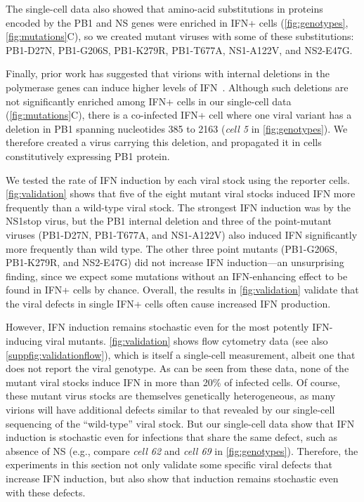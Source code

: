 \documentclass[lineno]{asm-article}
\newcommand{\FIG}[1]{\autoref{fig:#1}}
\newcommand{\SUPPFIG}[1]{\autoref{suppfig:#1}}
\begin{document}
The single-cell data also showed that amino-acid substitutions in proteins encoded by the PB1 and NS genes were enriched in IFN+ cells (\FIG{genotypes}, \FIG{mutations}C), so we created mutant viruses with some of these substitutions:
PB1-D27N, PB1-G206S, PB1-K279R, PB1-T677A, NS1-A122V, and NS2-E47G.

Finally, prior work has suggested that virions with internal deletions in the polymerase genes can induce higher levels of IFN~\cite{wang2018cell, baum2010preference, tapia2013defective, boergeling2015evidence, dimmock2015cloned, liu2019inhibition}.
Although such deletions are not significantly enriched among IFN+ cells in our single-cell data (\FIG{mutations}C), there is a co-infected IFN+ cell where one viral variant has a deletion in PB1 spanning nucleotides 385 to 2163 (\textit{cell 5} in \FIG{genotypes}).
We therefore created a virus carrying this deletion, and propagated it in cells constitutively expressing PB1 protein.

We tested the rate of IFN induction by each viral stock using the reporter cells.
\FIG{validation} shows that five of the eight mutant viral stocks induced IFN more frequently than a wild-type viral stock.
The strongest IFN induction was by the NS1stop virus, but the PB1 internal deletion and three of the point-mutant viruses (PB1-D27N, PB1-T677A, and NS1-A122V) also induced IFN significantly more frequently than wild type.
The other three point mutants (PB1-G206S, PB1-K279R, and NS2-E47G) did not increase IFN induction---an unsurprising finding, since we expect some mutations without an IFN-enhancing effect to be found in IFN+ cells by chance.
Overall, the results in \FIG{validation} validate that the viral defects in single IFN+ cells often cause increased IFN production.

However, IFN induction remains stochastic even for the most potently IFN-inducing viral mutants.
\FIG{validation} shows flow cytometry data (see also \SUPPFIG{validationflow}), which is itself a single-cell measurement, albeit one that does not report the viral genotype.
As can be seen from these data, none of the mutant viral stocks induce IFN in more than 20\% of infected cells. 
Of course, these mutant virus stocks are themselves genetically heterogeneous, as many virions will have additional defects similar to that revealed by our single-cell sequencing of the ``wild-type'' viral stock.
But our single-cell data show that IFN induction is stochastic even for infections that share the same defect, such as absence of NS (e.g., compare \textit{cell 62} and \textit{cell 69} in \FIG{genotypes}).
Therefore, the experiments in this section not only validate some specific viral defects that increase IFN induction, but also show that induction remains stochastic even with these defects.
\end{document}
